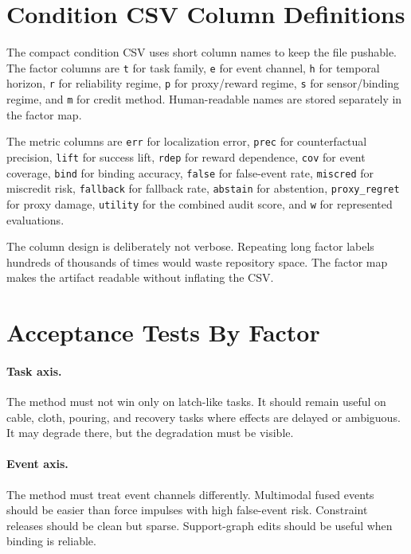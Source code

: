 \documentclass{article}
\begin{document}
\section{Condition CSV Column Definitions}

The compact condition CSV uses short column names to keep the file pushable. The factor columns are \texttt{t} for task family, \texttt{e} for event channel, \texttt{h} for temporal horizon, \texttt{r} for reliability regime, \texttt{p} for proxy/reward regime, \texttt{s} for sensor/binding regime, and \texttt{m} for credit method. Human-readable names are stored separately in the factor map.

The metric columns are \texttt{err} for localization error, \texttt{prec} for counterfactual precision, \texttt{lift} for success lift, \texttt{rdep} for reward dependence, \texttt{cov} for event coverage, \texttt{bind} for binding accuracy, \texttt{false} for false-event rate, \texttt{miscred} for miscredit risk, \texttt{fallback} for fallback rate, \texttt{abstain} for abstention, \texttt{proxy\_regret} for proxy damage, \texttt{utility} for the combined audit score, and \texttt{w} for represented evaluations.

The column design is deliberately not verbose. Repeating long factor labels hundreds of thousands of times would waste repository space. The factor map makes the artifact readable without inflating the CSV.

\section{Acceptance Tests By Factor}

\paragraph{Task axis.}
The method must not win only on latch-like tasks. It should remain useful on cable, cloth, pouring, and recovery tasks where effects are delayed or ambiguous. It may degrade there, but the degradation must be visible.

\paragraph{Event axis.}
The method must treat event channels differently. Multimodal fused events should be easier than force impulses with high false-event risk. Constraint releases should be clean but sparse. Support-graph edits should be useful when binding is reliable.
\end{document}

